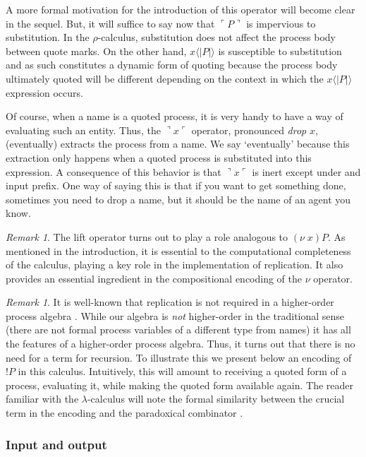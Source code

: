 \documentclass[]{amsart}
\newcommand{\lliftb}{\langle\!|}
\newcommand{\rliftb}{|\!\rangle}
\newcommand{\lpquote}{\ulcorner}
\newcommand{\rpquote}{\urcorner}
\newcommand{\lift}[2]{#1 \lliftb #2 \rliftb}
\newcommand{\quotep}[1]{\lpquote #1 \rpquote}
\newcommand{\dropn}[1]{\rpquote #1 \lpquote}
\theoremstyle{definition}
\theoremstyle{remark}
\newtheorem{rem}[thm]{Remark}
\numberwithin{equation}{subsection}
\begin{document}
A more formal motivation for the introduction of this operator will
become clear in the sequel. But, it will suffice to say now that
$\quotep{P}$ is impervious to substitution. In the $\rho$-calculus,
substitution does not affect the process body between quote marks. On
the other hand, $\lift{x}{P}$ is susceptible to substitution and as
such constitutes a dynamic form of quoting because the process body
ultimately quoted will be different depending on the context in which
the $\lift{x}{P}$ expression occurs.

Of course, when a name is a quoted process, it is very handy to have a
way of evaluating such an entity. Thus, the $\dropn{x}$ operator,
pronounced \textit{drop} $x$, (eventually) extracts the process from a
name. We say `eventually' because this extraction only happens when a
quoted process is substituted into this expression. A consequence of
this behavior is that $\dropn{x}$ is inert except under and input
prefix. One way of saying this is that if you want to get something
done, sometimes you need to drop a name, but it should be the name of
an agent you know.

\begin{rem} %
The lift operator turns out to play a role analogous to $(\nu \;
x)P$. As mentioned in the introduction, it is essential to the
computational completeness of the calculus, playing a key role in the
implementation of replication. It also provides an essential
ingredient in the compositional encoding of the $\nu$ operator.
\end{rem}

\begin{rem} %
It is well-known that replication is not required in a higher-order
process algebra \cite{SangiorgiWalker}. While our algebra is
\textit{not} higher-order in the traditional sense (there are not
formal process variables of a different type from names) it has all
the features of a higher-order process algebra. Thus, it turns out
that there is no need for a term for recursion. To illustrate this we
present below an encoding of $!P$ in this calculus. Intuitively, this
will amount to receiving a quoted form of a process, evaluating it,
while making the quoted form available again. The reader familiar with
the $\lambda$-calculus will note the formal similarity between the
crucial term in the encoding and the paradoxical combinator
\cite{Barendregt84}.
\end{rem}

\subsubsection{Input and output}
\end{document}
